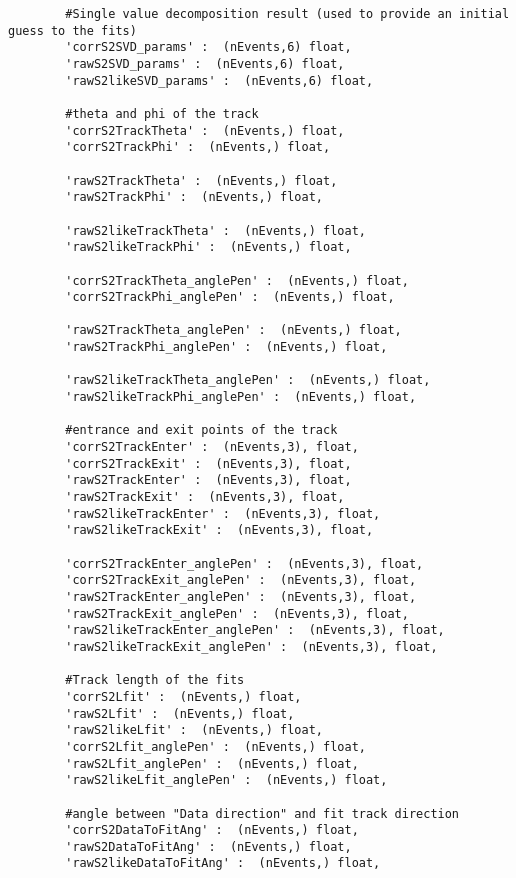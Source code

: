 \begin{verbatim}
        #Single value decomposition result (used to provide an initial guess to the fits)
        'corrS2SVD_params' :  (nEvents,6) float,
        'rawS2SVD_params' :  (nEvents,6) float,
        'rawS2likeSVD_params' :  (nEvents,6) float,
        
        #theta and phi of the track
        'corrS2TrackTheta' :  (nEvents,) float, 
        'corrS2TrackPhi' :  (nEvents,) float, 
        
        'rawS2TrackTheta' :  (nEvents,) float, 
        'rawS2TrackPhi' :  (nEvents,) float,
        
        'rawS2likeTrackTheta' :  (nEvents,) float, 
        'rawS2likeTrackPhi' :  (nEvents,) float,
        
        'corrS2TrackTheta_anglePen' :  (nEvents,) float, 
        'corrS2TrackPhi_anglePen' :  (nEvents,) float, 
        
        'rawS2TrackTheta_anglePen' :  (nEvents,) float, 
        'rawS2TrackPhi_anglePen' :  (nEvents,) float, 
        
        'rawS2likeTrackTheta_anglePen' :  (nEvents,) float, 
        'rawS2likeTrackPhi_anglePen' :  (nEvents,) float, 
        
        #entrance and exit points of the track
        'corrS2TrackEnter' :  (nEvents,3), float, 
        'corrS2TrackExit' :  (nEvents,3), float, 
        'rawS2TrackEnter' :  (nEvents,3), float, 
        'rawS2TrackExit' :  (nEvents,3), float,
        'rawS2likeTrackEnter' :  (nEvents,3), float, 
        'rawS2likeTrackExit' :  (nEvents,3), float,
        
        'corrS2TrackEnter_anglePen' :  (nEvents,3), float, 
        'corrS2TrackExit_anglePen' :  (nEvents,3), float, 
        'rawS2TrackEnter_anglePen' :  (nEvents,3), float, 
        'rawS2TrackExit_anglePen' :  (nEvents,3), float,
        'rawS2likeTrackEnter_anglePen' :  (nEvents,3), float,
        'rawS2likeTrackExit_anglePen' :  (nEvents,3), float,
        
        #Track length of the fits
        'corrS2Lfit' :  (nEvents,) float, 
        'rawS2Lfit' :  (nEvents,) float,
        'rawS2likeLfit' :  (nEvents,) float,
        'corrS2Lfit_anglePen' :  (nEvents,) float, 
        'rawS2Lfit_anglePen' :  (nEvents,) float,
        'rawS2likeLfit_anglePen' :  (nEvents,) float,
        
        #angle between "Data direction" and fit track direction
        'corrS2DataToFitAng' :  (nEvents,) float, 
        'rawS2DataToFitAng' :  (nEvents,) float, 
        'rawS2likeDataToFitAng' :  (nEvents,) float, 
        

\end{verbatim}
